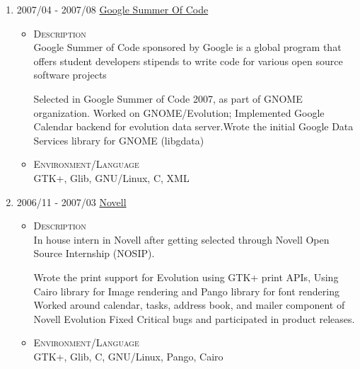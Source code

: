 \documentclass[a4paper,10pt]{article}
\begin{document}
\begin{enumerate}
\begin{itemize}
   \end{itemize}

\item \textsc{2007/04} - \textsc{2007/08} \href{https://developers.google.com/open-source/gsoc/2007/}{Google Summer Of Code} \\
  \begin {itemize}
  \item \textsc{Description} \\
  Google Summer of Code sponsored by Google is a global program that offers student
  developers stipends to write code for various open source software projects

  Selected in Google Summer of Code 2007, as part of GNOME organization.
  Worked on GNOME/Evolution; Implemented Google Calendar backend for evolution data server.Wrote the initial Google Data Services library for GNOME (libgdata)

\item \textsc{Environment/Language} \\
  GTK+, Glib, GNU/Linux, C, XML  
  \end {itemize}

\item \textsc{2006/11 - 2007/03} \href{www.novell.com}{Novell} \\
  \begin {itemize}
  \item \textsc{Description} \\
  
  In house intern in Novell after getting selected through Novell Open Source Internship (NOSIP).
 
  Wrote the print support for Evolution using GTK+ print APIs, Using Cairo library for Image rendering and Pango library for font rendering
  Worked around calendar, tasks, address book, and mailer component of Novell Evolution
  Fixed Critical bugs and participated in product releases.
\item \textsc{Environment/Language} \\
  GTK+, Glib, C, GNU/Linux, Pango, Cairo
  \end {itemize}
\end{enumerate}

\end{document}
